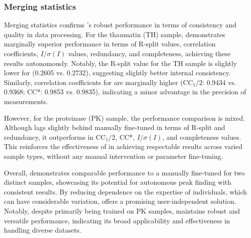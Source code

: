 \documentclass[a4paper]{article}
\begin{document}
\subsubsection{Merging statistics}

Merging statistics confirms \peaknet{}'s robust performance in terms of consistency and quality in data processing.  For the thaumatin (TH) sample, \peaknet{} demonstrates marginally superior performance in terms of R-split values, correlation coefficients, $I/\sigma(I)$ values, redundancy, and completeness, achieving these results autonomously.  Notably, the R-split value for the TH sample is slightly lower for \peaknet{} (0.2605 vs. 0.2732), suggesting slightly better internal consistency. Similarly, correlation coefficients for \peaknet{} are marginally higher (CC$_1/2$: 0.9434 vs.  0.9368; CC*: 0.9853 vs. 0.9835), indicating a minor advantage in the precision of measurements.

However, for the proteinase (PK) sample, the performance comparison is mixed.  Although \peaknet{} lags slightly behind manually fine-tuned \psocake{} in terms of R-split and redundancy, it outperforms in CC$_1/2$, CC*, $I/\sigma(I)$, and completeness values.  This reinforces the effectiveness of \peaknet{} in achieving respectable results across varied sample types, without any manual intervention or parameter fine-tuning.  

Overall, \peaknet{} demonstrates comparable performance to a manually fine-tuned \psocake{} for two distinct samples, showcasing its potential for autonomous peak finding with consistent results.  By reducing dependence on the expertise of individuals, which can have considerable variation, \peaknet{} offers a promising user-independent solution.  Notably, despite primarily being trained on PK samples, \peaknet{} maintains robust and versatile performance, indicating its broad applicability and effectiveness in handling diverse datasets.
\end{document}
